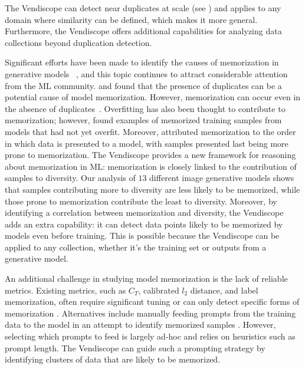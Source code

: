 The Vendiscope can detect near duplicates at scale (see ) and applies to any domain where similarity can be defined, which makes it more general. Furthermore, the Vendiscope offers additional capabilities for analyzing data collections beyond duplication detection. 

 Significant efforts have been made to identify the causes of memorization in generative models ~\citep{jagielski2022measuring, kandpal2022deduplicating, lee2021deduplicating, somepalli2023diffusion, tirumala2022memorization}, and this topic continues to attract considerable attention from the ML community. \citet{kandpal2022deduplicating} and \citet{lee2021deduplicating} found that the presence of duplicates can be a potential cause of model memorization. However, memorization can occur even in the absence of duplicates~\citep{somepalli2023diffusion}. Overfitting has also been thought to contribute to memorization; however, \citet{tirumala2022memorization} found examples of memorized training samples from models that had not yet overfit. Moreover, \citet{jagielski2022measuring} attributed memorization to the order in which data is presented to a model, with samples presented last being more prone to memorization. The Vendiscope provides a new framework for reasoning about memorization in ML: memorization is closely linked to the contribution of samples to diversity. Our analysis of $13$ different image generative models shows that samples contributing more to diversity are less likely to be memorized, while those prone to memorization contribute the least to diversity. Moreover, by identifying a correlation between memorization and diversity, the Vendiscope adds an extra capability: it can detect data points likely to be memorized by models even before training. This is possible because the Vendiscope can be applied to any collection, whether it's the training set or outputs from a generative model.

An additional challenge in studying model memorization is the lack of reliable metrics. Existing metrics, such as \(C_T\), calibrated \(l_2\) distance, and label memorization, often require significant tuning or can only detect specific forms of memorization \citep{meehan2020non, stein2023exposing, pondenkandath2018leveraging}. Alternatives include manually feeding prompts from the training data to the model in an attempt to identify memorized samples \citep{carlini2022quantifying}. However, selecting which prompts to feed is largely ad-hoc and relies on heuristics such as prompt length. The Vendiscope can guide such a prompting strategy by identifying clusters of data that are likely to be memorized.

